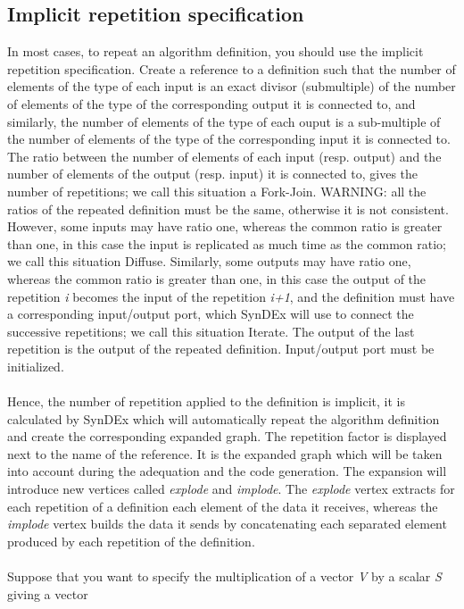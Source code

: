 \documentclass[11pt,twoside]{report}
\begin{document}
\subsection{Implicit repetition specification}
In most cases, to repeat an algorithm definition, you should use the
implicit repetition specification. Create a reference
to a definition such that the number of elements of the type of each
input is an exact divisor (submultiple) of the number of elements of
the type of the corresponding output it is connected to, and
similarly, the number of elements of the type of each ouput is a
sub-multiple of the number of elements of the type of the
corresponding input it is connected to.  The ratio between the number
of elements of each input (resp.  output) and the number of elements
of the output (resp. input) it is connected to, gives the number of
repetitions; we call this situation a Fork-Join. WARNING: all the
ratios of the repeated definition must be the same, otherwise it is
not consistent. However, some inputs may have ratio one, whereas the
common ratio is greater than one, in this case the input is replicated
as much time as the common ratio; we call this situation Diffuse.
Similarly, some outputs may have ratio one, whereas the common ratio
is greater than one, in this case the output of the repetition {\it i}
becomes the input of the repetition {\it i+1}, and the definition must
have a corresponding input/output port, which SynDEx will use to
connect the successive repetitions; we call this situation Iterate.
The output of the last repetition is the output of the
repeated definition. Input/output port must be initialized.\\\\
Hence, the number of repetition applied to the definition is implicit,
it is calculated by SynDEx which will automatically repeat the
algorithm definition and create the corresponding expanded graph. The
repetition factor is displayed next to the name of the reference. It
is the expanded graph which will be taken into account during the
adequation and the code generation.  The expansion will introduce new
vertices called {\it explode} and {\it implode}. The {\it explode}
vertex extracts for each repetition of a definition each element of
the data it receives, whereas the {\it implode} vertex builds the data
it sends by concatenating each separated element produced by each
repetition of the definition.\\\\
Suppose that you want to specify the
multiplication of a vector {\it V} by a scalar {\it S} giving a vector
\end{document}
